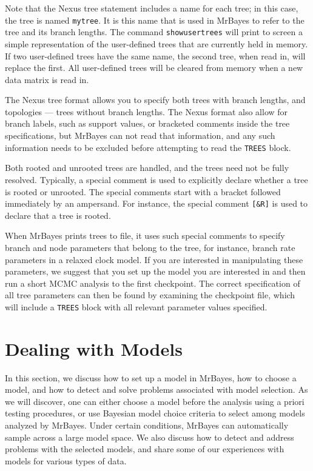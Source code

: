 \documentclass[12pt]{book}
\begin{document}
Note that the Nexus tree statement includes a name for each tree; in this case, the tree is named
\texttt{mytree}. It is this name that is used in MrBayes to refer to the tree and its branch
lengths.  The command \texttt{showusertrees} will print to screen a simple representation of the
user-defined trees that are currently held in memory. If two user-defined trees have the same name,
the second tree, when read in, will replace the first. All user-defined trees will be cleared from
memory when a new data matrix is read in.

The Nexus tree format allows you to specify both trees with branch lengths, and topologies ---
trees without branch lengths. The Nexus format also allow for branch labels, such as support
values, or bracketed comments inside the tree specifications, but MrBayes can not read that
information, and any such information needs to be excluded before attempting to read the
\texttt{TREES} block.

Both rooted and unrooted trees are handled, and the trees need not be fully resolved. Typically, a
special comment is used to explicitly declare whether a tree is rooted or unrooted. The special
comments start with a bracket followed immediately by an ampersand. For instance, the special
comment \texttt{[\&R]} is used to declare that a tree is rooted.

When MrBayes prints trees to file, it uses such special comments to specify branch and node
parameters that belong to the tree, for instance, branch rate parameters in a relaxed clock model.
If you are interested in manipulating these parameters, we suggest that you set up the model you
are interested in and then run a short MCMC analysis to the first checkpoint. The correct
specification of all tree parameters can then be found by examining the checkpoint file, which will
include a \texttt{TREES} block with all relevant parameter values specified.

\section{Dealing with Models}

In this section, we discuss how to set up a model in MrBayes, how to choose a model, and how to
detect and solve problems associated with model selection. As we will discover, one can either
choose a model before the analysis using a priori testing procedures, or use Bayesian model choice
criteria to select among models analyzed by MrBayes. Under certain conditions, MrBayes can
automatically sample across a large model space. We also discuss how to detect and address problems
with the selected models, and share some of our experiences with models for various types of data.
\end{document}
